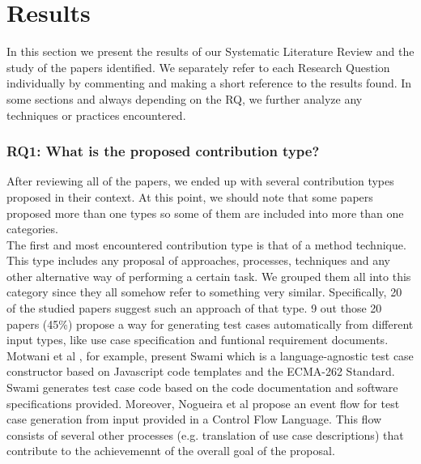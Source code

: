 \chapter*{Results}

In this section we present the results of our Systematic Literature Review and the study of the papers identified. We separately refer to 
each Research Question individually by commenting and making a short reference to the results found. In some sections and always depending on the RQ, we further analyze any 
techniques or practices encountered.

\subsection*{RQ1: What is the proposed contribution type?}
After reviewing all of the papers, we ended up with several contribution types proposed in their context. At this point, we should note that some papers 
proposed more than one types so some of them are included into more than one categories. \\

The first and most encountered contribution type is that of a method technique. This type includes any proposal of approaches, processes, techniques and any 
other alternative way of performing a certain task. We grouped them all into this category since they all somehow refer to something very similar. Specifically, 20 of the
studied papers suggest such an approach of that type. 9 out those 20 papers (45\%) propose a way for generating test cases automatically from different input types, like 
use case specification and funtional requirement documents. Motwani et al \cite{8812070}, for example, present Swami which is a language-agnostic test case constructor 
based on Javascript code templates and the ECMA-262 Standard. Swami generates test case code based on the code documentation and software specifications provided. Moreover, 
Nogueira et al \cite{nogueira2015automatic} propose an event flow for test case generation from input provided in a Control Flow Language. This flow consists of several other 
processes (e.g. translation of use case descriptions) that contribute to the achievemennt of the overall goal of the proposal. \\

